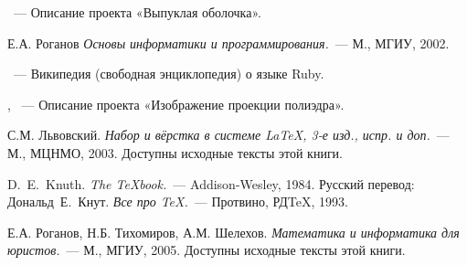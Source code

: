 \begin{thebibliography}{}

~---
Описание проекта «Выпуклая оболочка».

Е.А. Роганов
{\em Основы информатики и программирования.}~---
М., МГИУ, 2002.

~---
Википедия (свободная энциклопедия) о языке Ruby.

, 
~---
Описание проекта «Изображение проекции полиэдра».

С.М. Львовский.
{\em Набор и вёрстка в системе \LaTeX, 3-е изд., испр. и доп.}~---
М., МЦНМО, 2003. Доступны исходные тексты этой книги.

D.~E.~Knuth. {\em The \TeX{}book.}~---
Addison-Wesley, 1984. Русский перевод:
Дональд~Е.~Кнут.
{\em Все про \TeX.}~--- Протвино, РД\TeX, 1993.

Е.А. Роганов, Н.Б. Тихомиров, А.М. Шелехов.
{\em Математика и информатика для юристов.}~---
М., МГИУ, 2005.
Доступны исходные тексты этой книги.

\end{thebibliography}
